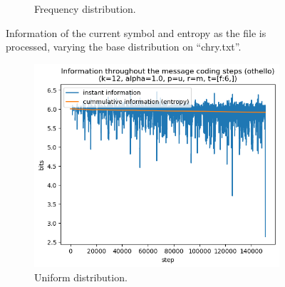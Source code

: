 \documentclass{article}
\begin{document}
\begin{figure}
\begin{subfigure}[b]{0.45\textwidth}
\begin{center}
        \end{center}
        \caption{Frequency distribution.}
        \label{fig:results-distribution-frequency}
    \end{subfigure}
    \caption{Information of the current symbol and entropy as the file is processed, varying the base distribution on ``chry.txt''.}
    \label{fig:results-distribution}
\end{figure}

\begin{figure}
    \begin{subfigure}[b]{0.45\textwidth}
        \begin{center}
            \includegraphics[width=1.0\linewidth]{../scripts/images/othello_12_1.0_u_m_[f:6,].png}
        \end{center}
        \caption{Uniform distribution.}
        \label{fig:results-distribution-other-uniform}
    \end{subfigure}
    \hfill
    \begin{subfigure}[b]{0.45\textwidth}
        \begin{center}

\end{center}
\end{subfigure}
\end{figure}
\end{document}
